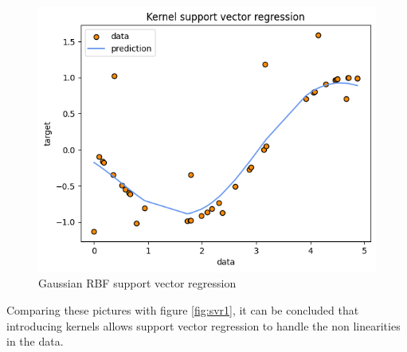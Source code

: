 \begin{figure}
    \includegraphics[width=\textwidth]{images/svr3.png}
    \caption{Gaussian RBF support vector regression}
    \label{fig:svr3}
\end{figure}
Comparing these pictures with figure \ref{fig:svr1}, it can be concluded that introducing kernels allows support vector regression to handle the non linearities in the data.
